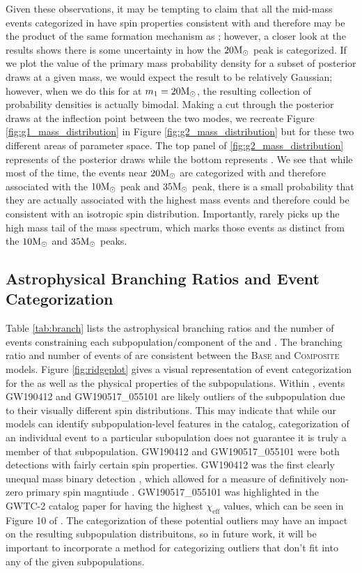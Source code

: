 Given these observations, it may be tempting to claim that all the mid-mass events categorized in \contA{} have spin properties consistent with \first{} and therefore may be the product of the same formation mechanism as \first{}; however, a closer look at the results shows there is some uncertainty in how the $20 {\rm M}_\odot$ peak is categorized. If we plot the value of the primary mass probability density for a subset of posterior draws at a given mass, we would expect the result to be relatively Gaussian; however, when we do this for \contB{} at $m_1 = 20 {\rm M}_\odot$, the resulting collection of probability densities is actually bimodal. Making a cut through the posterior draws at the inflection point between the two modes, we recreate Figure \ref{fig:g1_mass_distribution} in Figure \ref{fig:g2_mass_distribution} but for these two different areas of parameter space. The top panel of \ref{fig:g2_mass_distribution} represents  of the posterior draws while the bottom represents . We see that while most of the time, the events near $20{\rm M}_\odot$ are categorized with \contA{} and therefore associated with the $10{\rm M}_\odot$ peak and $35{\rm M}_\odot$ peak, there is a small probability that they are actually associated with the highest mass events and therefore could be consistent with an isotropic spin distribution. Importantly, \contA{} rarely picks up the high mass tail of the mass spectrum, which marks those events as distinct from the $10{\rm M}_\odot$ and $35{\rm M}_\odot$ peaks. 

\subsection{Astrophysical Branching Ratios and Event Categorization}

Table \ref{tab:branch} lists the astrophysical branching ratios and the number of events constraining each subpopulation/component of the \base{} and \comp{}. The branching ratio and number of events of \first{} are consistent between the \textsc{Base} and \textsc{Composite} models. Figure \ref{fig:ridgeplot} gives a visual representation of event categorization for the \comp{} as well as the physical properties of the subpopulations. Within \contA{}, events GW190412 and GW190517\_055101 are likely outliers of the subpopulation due to their visually different spin distributions. This may indicate that while our models can identify subpopulation-level features in the catalog, categorization of an individual event to a particular subopulation does not guarantee it is truly a member of that subpopulation. GW190412 and GW190517\_055101 were both detections with fairly certain spin properties. GW190412 was the first clearly unequal mass binary detection , which allowed for a measure of definitively non-zero primary spin magntiude . GW190517\_055101 was highlighted in the GWTC-2 catalog paper  for having the highest $\chi_\text{eff}$ values, which can be seen in Figure 10 of . The categorization of these potential outliers may have an impact on the resulting subpopulation distribuitons, so in future work, it will be important to incorporate a method for categorizing outliers that don't fit into any of the given subpopulations. 

